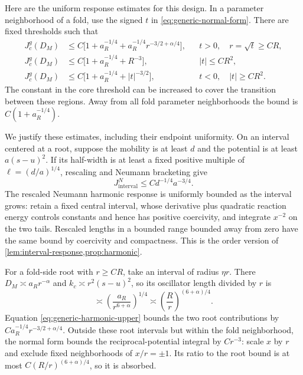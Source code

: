 Here are the uniform response estimates for this design. In a parameter
neighborhood of a fold, use the signed $t$ in
\eqref{eq:generic-normal-form}. There are fixed thresholds such that
\begin{align}
 J_c^g(D_M)&\le C\bigl[1+a_R^{-1/4}
              +a_R^{-1/4}r^{-3/2+\alpha/4}\bigr],
       &&t>0,\quad r=\sqrt t\ge CR,\label{eq:generic-root-upper}\\
 J_c^g(D_M)&\le C\bigl[1+a_R^{-1/4}+R^{-3}\bigr],
       &&|t|\le CR^2,\label{eq:generic-core-upper}\\
 J_c^g(D_M)&\le C\bigl[1+a_R^{-1/4}+|t|^{-3/2}\bigr],
       &&t<0,\quad |t|\ge CR^2.\label{eq:generic-out-upper}
\end{align}
The constant in the core threshold can be increased to cover the
transition between these regions. Away from all fold parameter
neighborhoods the bound is $C(1+a_R^{-1/4})$.

We justify these estimates, including their endpoint uniformity.
On an interval centered at a root, suppose the mobility is at least
$d$ and the potential is at least $a(s-u)^2$. If its half-width is
at least a fixed positive multiple of $\ell=(d/a)^{1/4}$,
rescaling and Neumann bracketing give
\begin{equation}\label{eq:generic-harmonic-upper}
 J_{\mathrm{interval}}^N\le C d^{-1/4}a^{-3/4}.
\end{equation}
The rescaled Neumann harmonic response is uniformly bounded as the
interval grows: retain a fixed central interval, whose derivative plus
quadratic reaction energy controls constants and hence has positive
coercivity, and integrate $x^{-2}$ on the two tails. Rescaled lengths
in a bounded range bounded away from zero have the same bound by
coercivity and compactness. This is the order version of
\cref{lem:interval-response,prop:harmonic}.

For a fold-side root with $r\ge CR$, take an interval of radius
$\eta r$. There $D_M\asymp a_Rr^{-\alpha}$ and
$k_c\asymp r^2(s-u)^2$, so its oscillator length divided by $r$ is
\[
 \asymp\left(\frac{a_R}{r^{6+\alpha}}\right)^{1/4}
 \asymp\left(\frac Rr\right)^{(6+\alpha)/4}.
\]
Equation \eqref{eq:generic-harmonic-upper} bounds the two root
contributions by $Ca_R^{-1/4}r^{-3/2+\alpha/4}$.
Outside these root intervals but within the fold neighborhood, the
normal form bounds the reciprocal-potential integral by $Cr^{-3}$:
scale $x$ by $r$ and exclude fixed neighborhoods of $x/r=\pm1$.
Its ratio to the root bound is at most
$C(R/r)^{(6+\alpha)/4}$, so it is absorbed.

